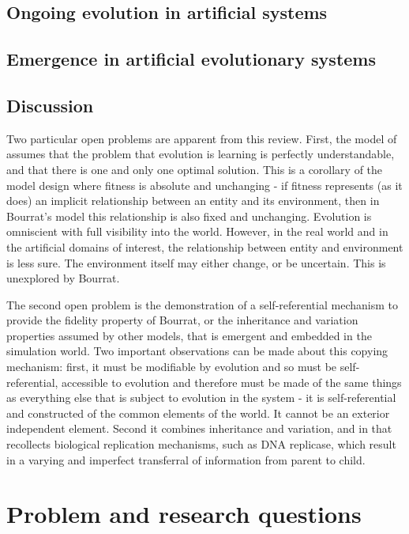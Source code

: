 \subsection{Ongoing evolution in artificial systems}
\subsection{Emergence in artificial evolutionary systems}

\subsection{Discussion}

Two particular open problems are apparent from this review. First, the model of \cite{Bourrat2015} assumes that the problem that evolution is learning is perfectly understandable, and that there is one and only one optimal solution. This is a corollary of the model design where fitness is absolute and unchanging - if fitness represents (as it does) an implicit relationship between an entity and its environment, then in Bourrat's model this relationship is also fixed and unchanging. Evolution is omniscient with full visibility into the world. However, in the real world and in the artificial domains of interest, the relationship between entity and environment is less sure. The environment itself may either change, or be uncertain. This is unexplored by Bourrat.

The second open problem is the demonstration of a self-referential mechanism to provide the fidelity property of Bourrat, or the inheritance and variation properties assumed by other models, that is emergent and embedded in the simulation world. Two important observations can be made about this copying mechanism: first, it must be modifiable by evolution and so must be self-referential, accessible to evolution and therefore must be made of the same things as everything else that is subject to evolution in the system - it is self-referential and constructed of the common elements of the world. It cannot be an exterior independent element. Second it combines inheritance and variation, and in that recollects biological replication mechanisms, such as DNA replicase, which result in a varying and imperfect transferral of information from parent to child. 

\section{Problem and research questions}\label{research-questions}

